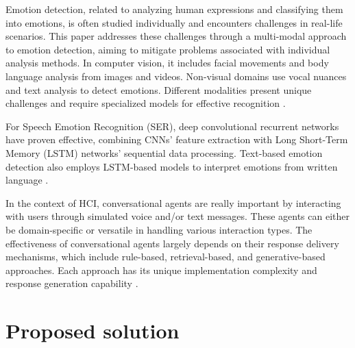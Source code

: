 \documentclass[runningheads]{llncs}
\begin{document}
Emotion detection, related to analyzing human expressions and classifying them into emotions, is often studied individually and encounters challenges in real-life scenarios. This paper addresses these challenges through a multi-modal approach to emotion detection, aiming to mitigate problems associated with individual analysis methods. In computer vision, it includes facial movements and body language analysis from images and videos. Non-visual domains use vocal nuances and text analysis to detect emotions. Different modalities present unique challenges and require specialized models for effective recognition \cite{Chul2018, Trigeorgis2016, Karna2020}.

For Speech Emotion Recognition (SER), deep convolutional recurrent networks have proven effective, combining CNNs' feature extraction with Long Short-Term Memory (LSTM) networks' sequential data processing. Text-based emotion detection also employs LSTM-based models to interpret emotions from written language \cite{Trigeorgis2016, Karna2020}.

In the context of HCI, conversational agents are really important by interacting with users through simulated voice and/or text messages. These agents can either be domain-specific or versatile in handling various interaction types. The effectiveness of conversational agents largely depends on their response delivery mechanisms, which include rule-based, retrieval-based, and generative-based approaches. Each approach has its unique implementation complexity and response generation capability \cite{aljaroodi_avatars_2019, fernandes_survey_2020, ramesh_survey_2017, mohamad_suhaili_service_2021}.

\section{Proposed solution}
\label{sec:solution}
\end{document}
